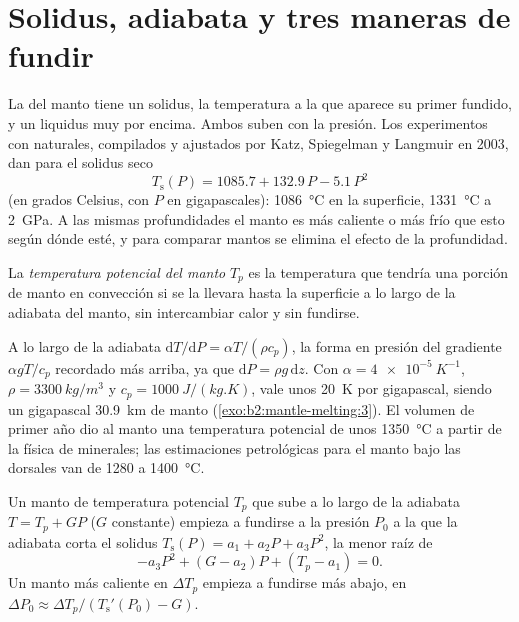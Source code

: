 \section{Solidus, adiabata y tres maneras de fundir}\label{sec:b2:mantle-melting:solidus}

La  del manto tiene un solidus, la temperatura a la que aparece su primer fundido,
y un liquidus muy por encima. Ambos suben con la presión. Los experimentos con 
naturales, compilados y ajustados por Katz, Spiegelman y Langmuir en 2003, dan
para el solidus seco
\[
  T_{\mathrm{s}}(P) = 1085.7 + 132.9\,P - 5.1\,P^2
\]
(en grados Celsius, con $P$ en gigapascales): \qty{1086}{\celsius} en la superficie,
\qty{1331}{\celsius} a \qty{2}{GPa}. A las mismas profundidades el manto es más caliente o más
frío que esto según dónde esté, y para comparar mantos se elimina el
efecto de la profundidad.

\begin{definition}\label{def:b2:mantle-melting:tp}
La \emph{temperatura potencial del manto} $T_p$
es la temperatura que tendría una porción de manto en convección si se la
llevara hasta la superficie a lo largo de la adiabata del manto, sin intercambiar calor y
sin fundirse.
\end{definition}

A lo largo de la adiabata $\mathrm dT/\mathrm dP = \alpha T/(\rho c_p)$, la forma en
presión del gradiente $\alpha gT/c_p$ recordado más arriba, ya que $\mathrm dP = \rho
g\,\mathrm dz$. Con $\alpha = \qty{4e-5}{K^{-1}}$, $\rho = \qty{3300}{kg/m^3}$
y $c_p = \qty{1000}{J/(kg.K)}$, vale unos \qty{20}{K} por gigapascal, siendo un
gigapascal \qty{30.9}{km} de manto (\cref{exo:b2:mantle-melting:3}). El volumen de primer año dio
al manto una temperatura potencial de unos \qty{1350}{\celsius} a partir de la física de
minerales; las estimaciones petrológicas para el manto bajo las dorsales van de 1280 a
\qty{1400}{\celsius}.

\begin{proposition}\label{prop:b2:mantle-melting:onset}
Un manto de temperatura potencial $T_p$ que sube a lo largo de la adiabata $T = T_p + GP$ ($G$
constante) empieza a fundirse a la presión $P_0$ a la que la adiabata corta el
solidus $T_{\mathrm s}(P) = a_1 + a_2P + a_3P^2$, la menor raíz de
\[
  -a_3P^2 + (G - a_2)P + (T_p - a_1) = 0 .
\]
Un manto más caliente en $\Delta T_p$ empieza a fundirse más abajo, en $\Delta P_0 \approx
\Delta T_p/(T_{\mathrm s}'(P_0) - G)$.
\end{proposition}

